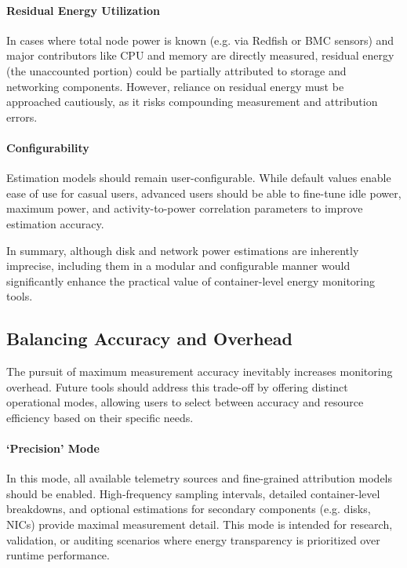 \paragraph{Residual Energy Utilization}
In cases where total node power is known (e.g. via Redfish or BMC sensors) and major contributors like CPU and memory are directly measured, residual energy (the unaccounted portion) could be partially attributed to storage and networking components. However, reliance on residual energy must be approached cautiously, as it risks compounding measurement and attribution errors.

\paragraph{Configurability}
Estimation models should remain user-configurable. While default values enable ease of use for casual users, advanced users should be able to fine-tune idle power, maximum power, and activity-to-power correlation parameters to improve estimation accuracy.

In summary, although disk and network power estimations are inherently imprecise, including them in a modular and configurable manner would significantly enhance the practical value of container-level energy monitoring tools.

\subsection{Balancing Accuracy and Overhead}
\label{sec:future-accuracy-overhead}

The pursuit of maximum measurement accuracy inevitably increases monitoring overhead. Future tools should address this trade-off by offering distinct operational modes, allowing users to select between accuracy and resource efficiency based on their specific needs.

\paragraph{‘Precision’ Mode}
In this mode, all available telemetry sources and fine-grained attribution models should be enabled. High-frequency sampling intervals, detailed container-level breakdowns, and optional estimations for secondary components (e.g. disks, NICs) provide maximal measurement detail. This mode is intended for research, validation, or auditing scenarios where energy transparency is prioritized over runtime performance.

